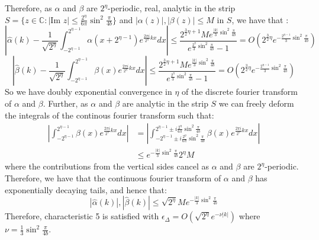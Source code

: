 \documentclass[aps,floatfix,10pt,amssymb,amsfont,amsmath,superscriptaddress,float,nofootinbib,longbibliography,nobalancelastpage,twocolumn]{revtex4-2}
\begin{document}
Therefore, as $\alpha$ and $\beta$ are $2^{\eta}$-periodic, real, analytic in the strip $S =\{z \in \mathbb{C}: |\text{Im } z| \leq \frac{2^{\eta}}{6\pi}\sin^2\frac{\pi}{4b}\}$ and $|\alpha(z)|, |\beta(z)| \leq M$ in $S$, we have that \cite{trefethen2014exponentially}:
\begin{equation}
\label{eq:conv1}
    \left|\hat\alpha(k) - \frac{1}{\sqrt{2^{\eta}}}\int_{-2^{\eta-1}}^{2^{\eta-1}}\alpha(x+2^{\eta-1})e^{\frac{2\pi i}{2^{\eta}}kx} dx\right| \leq \frac{2^{\frac{3}{2}\eta+1} Me^{\frac{|k|}{3}\sin^2 \frac{\pi}{4b}}}{e^{\frac{2^{\eta}}{3}\sin^2 \frac{\pi}{4b}}-1} = O(2^{\frac{3}{2}\eta}e^{-\frac{2^{\eta-1}}{3}\sin^2 \frac{\pi}{4b}})
\end{equation}
\begin{equation}
\label{eq:conv2}
    \left|\hat\beta(k) - \frac{1}{\sqrt{2^{\eta}}}\int_{-2^{\eta-1}}^{2^{\eta-1}}\beta(x)e^{\frac{2\pi i}{2^{\eta}}kx} dx\right| \leq  \frac{2^{\frac{3}{2}\eta+1}Me^{\frac{|k|}{3}\sin^2 \frac{\pi}{4b}}}{e^{\frac{2^{\eta}}{3}\sin^2 \frac{\pi}{4b}}-1}= O(2^{\frac{3}{2}\eta}e^{-\frac{2^{\eta-1}}{3}\sin^2 \frac{\pi}{4b}})
\end{equation}
So we have doubly exponential convergence in $\eta$ of the discrete fourier transform of $\alpha$ and $\beta$. Further, as $\alpha$ and $\beta$ are analytic in the strip $S$ we can freely deform the integrals of the continous fourier transform such that:
\begin{align}
    \left|\int_{-2^{\eta-1}}^{2^{\eta-1}}\beta(x)e^{\frac{2\pi i}{2^{\eta}}kx} dx\right| &=\left| \int_{-2^{\eta-1}\pm i\frac{2^{\eta}}{6\pi}\sin^2\frac{\pi}{4b}}^{2^{\eta-1}\pm i\frac{2^{\eta}}{6\pi}\sin^2\frac{\pi}{4b}}\beta(x)e^{\frac{2\pi i}{2^{\eta}}kx} dx\right|\\
    &\leq e^{-\frac{|k|}{3}\sin^2 \frac{\pi}{4b}}2^{\eta}M
    \label{eq:tails}
\end{align}
where the contributions from the vertical sides cancel as $\alpha$ and $\beta$ are $2^{\eta}$-periodic. Therefore, we have that the continuous fourier transform of $\alpha$ and $\beta$ has exponentially decaying tails, and hence that:
\begin{equation}
\label{eq:exactdecay}
    |\hat \alpha(k)|, |\hat \beta(k)| \leq \sqrt{2^{\eta}}Me^{-\frac{|k|}{3}\sin^2 \frac{\pi}{4b}}
\end{equation}
Therefore, characteristic 5 is satisfied with $\epsilon_{\Delta} =O\left( \sqrt{2^{\eta}}e^{-\nu |k|}\right)$ where $\nu = \frac{1}{3}\sin^2\frac{\pi}{4b}$.
\end{document}
